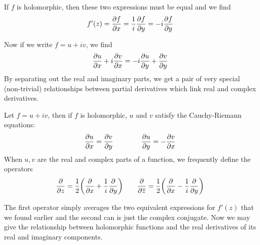 If $f$ is holomorphic, then these two expressions must be equal and we find
\[ f'(z) = \pdv{f}{x} = \frac{1}{i} \pdv{f}{y} = -i \pdv{f}{y} \]

Now if we write $f = u + iv$, we find
\[ \pdv{u}{x} + i \pdv{v}{x} = -i \pdv{u}{y} + \pdv{v}{y} \]
By separating out the real and imaginary parts, we get a pair of very special (non-trivial) relationships between partial derivatives which link real and complex derivatives.

\newpage 
\begin{definition}
	Let $f = u + iv$, then if $f$ is holomorphic, $u$ and $v$ satisfy the Cauchy-Riemann equations:
	\[ \pdv{u}{x} = \pdv{v}{y} \qquad \qquad \pdv{u}{y} = -\pdv{v}{x} \]
	When $u,v$ are the real and complex parts of a function, we frequently define the operators
	\[ \pdv{z} = \frac{1}{2} \qty( \pdv{x} + \frac{1}{i} \pdv{y}) \qquad \pdv{\overline{z}} = \frac{1}{2} \qty( \pdv{x} - \frac{1}{i} \pdv{y}) \]
\end{definition}

The first operator simply averages the two equivalent expressions for $f'(z)$ that we found earlier and the second can is just the complex conjugate. Now we may give the relationship between holomorphic functions and the real derivatives of its real and imaginary components.


